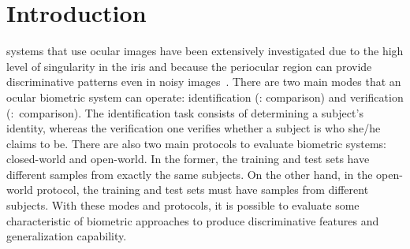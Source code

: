 \documentclass[journal]{IEEEtran}
\begin{document}
\section{Introduction}
\label{sec:introduction}
 systems that use ocular images have been extensively investigated due to the high level of singularity in the iris and because the periocular region can provide discriminative patterns even in noisy images~\cite{DeMarsico2017, Proenca2017irina, proenca2019inset, zanlorensi2020attnormalization, zanlorensi2020deep}.
There are two main modes that an ocular biometric system can operate: identification (: comparison) and verification (:~comparison). 
The identification task consists of determining a subject's identity, whereas the verification one verifies whether a subject is who she/he claims to be.
There are also two main protocols to evaluate biometric systems: closed-world and open-world.
In the former, the training and test sets have different samples from exactly the same subjects.
On the other hand, in the open-world protocol, the training and test sets must have samples from different subjects.
With these modes and protocols, it is possible to evaluate some characteristic of biometric approaches to produce discriminative features and generalization capability.
\end{document}
